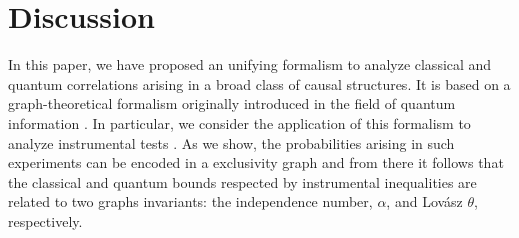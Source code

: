 \documentclass[letterpaper]{article}
\newcommand{\STAB}{\mathrm{STAB}}
\renewcommand{\TH}{\mathrm{TH}}
\begin{document}
%
%
%
\section{Discussion}
In this paper, we have proposed an unifying formalism to analyze classical and
quantum correlations arising in a broad class of causal structures. It is based
on a graph-theoretical formalism originally introduced in the field of quantum
information \cite{cabello2014,rabelo2014,acin2015}. In particular, we consider
the application of this formalism to analyze instrumental tests
\cite{pearl1995}. As we show, the probabilities arising in such experiments can
be encoded in a exclusivity graph and from there it follows that the classical
and quantum bounds respected by instrumental inequalities are related to two
graphs invariants: the independence number, $\alpha$, and Lov\'asz $\theta$,
respectively.
\end{document}
